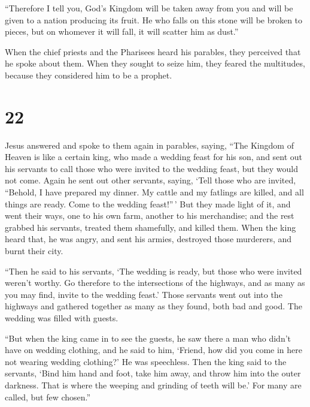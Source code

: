  ``Therefore I tell you, God's Kingdom will be taken away
from you and will be given to a nation producing its fruit.
 He who falls on this stone will be broken to pieces, but
on whomever it will fall, it will scatter him as dust.''

 When the chief priests and the Pharisees heard his
parables, they perceived that he spoke about them.  When
they sought to seize him, they feared the multitudes, because they
considered him to be a prophet.

\hypertarget{section-21}{%
\section{22}\label{section-21}}

 Jesus answered and spoke to them again in parables, saying,
 ``The Kingdom of Heaven is like a certain king, who made a
wedding feast for his son,  and sent out his servants to
call those who were invited to the wedding feast, but they would not
come.  Again he sent out other servants, saying, `Tell those
who are invited, ``Behold, I have prepared my dinner. My cattle and my
fatlings are killed, and all things are ready. Come to the wedding
feast!''\,'  But they made light of it, and went their ways,
one to his own farm, another to his merchandise;  and the
rest grabbed his servants, treated them shamefully, and killed them.
 When the king heard that, he was angry, and sent his
armies, destroyed those murderers, and burnt their city.

 ``Then he said to his servants, `The wedding is ready, but
those who were invited weren't worthy.  Go therefore to the
intersections of the highways, and as many as you may find, invite to
the wedding feast.'  Those servants went out into the
highways and gathered together as many as they found, both bad and good.
The wedding was filled with guests.

 ``But when the king came in to see the guests, he saw
there a man who didn't have on wedding clothing,  and he
said to him, `Friend, how did you come in here not wearing wedding
clothing?' He was speechless.  Then the king said to the
servants, `Bind him hand and foot, take him away, and throw him into the
outer darkness. That is where the weeping and grinding of teeth will
be.'  For many are called, but few chosen.''

